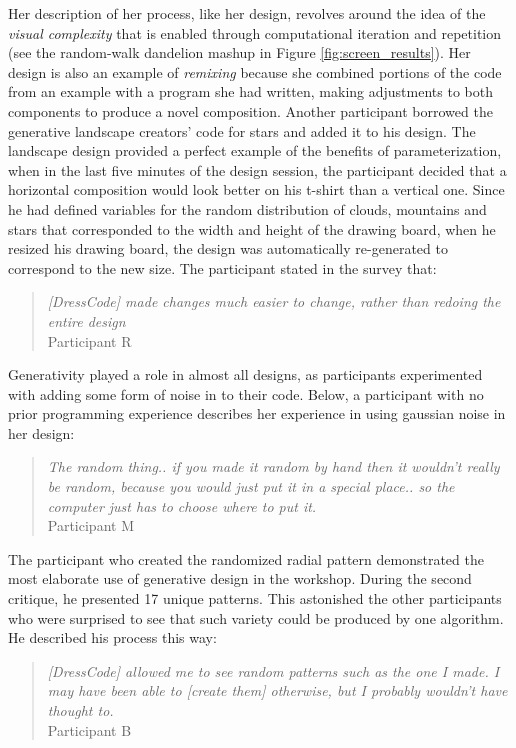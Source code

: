 \documentclass{sigchi}
\begin{document}
Her description of her process, like her design, revolves around the idea of the \textit{visual complexity} that is enabled through computational iteration and repetition (see the random-walk dandelion mashup in Figure \ref{fig:screen_results}). Her design is also an example of \textit{remixing} because she combined portions of the code from an example with a program she had written, making adjustments to both components to produce a novel composition. Another participant borrowed the generative landscape creators' code for stars and added it to his design. The landscape design provided a perfect example of the benefits of parameterization, when in the last five minutes of the design session, the participant decided that a horizontal composition would look better on his t-shirt than a vertical one. Since he had defined variables for the random distribution of clouds, mountains and stars that corresponded to the width and height of the drawing board, when he resized his drawing board, the design was automatically re-generated to correspond to the new size. The participant stated in the survey that:
\begin{quotation}
	\textit{[DressCode] made changes much easier to change, rather than redoing the entire design}
	\\Participant R
\end{quotation}
Generativity played a role in almost all designs, as participants experimented with adding some form of noise in to their code. Below, a participant with no prior programming experience describes her experience in using gaussian noise in her design:
\begin{quotation}
	\textit{The random thing.. if you made it random by hand then it wouldn't really be random, because you would just put it in a special place.. so the computer just has to choose where to put it.}
		\\Participant M
\end{quotation}
The participant who created the randomized radial pattern demonstrated the most elaborate use of generative design in the workshop. During the second critique, he presented 17 unique patterns. This astonished the other participants who were surprised to see that such variety could be produced by one algorithm. He described his process this way:
\begin{quotation} \emph{[DressCode] allowed me to see random patterns such as the one I made. I may have been able to [create them] otherwise, but I probably wouldn't have thought to.}
		\\Participant B
	\end{quotation}
\end{document}

